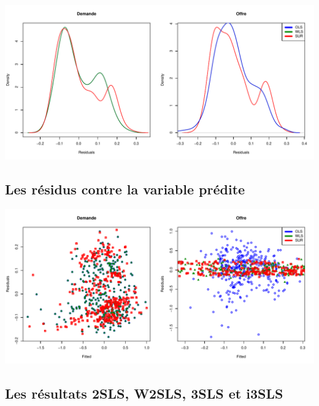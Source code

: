 \documentclass[11pt,]{article}
\begin{document}
\includegraphics{note2pres_files/figure-latex/unnamed-chunk-47-1.pdf}

\FloatBarrier

\hypertarget{les-residus-contre-la-variable-predite}{%
\subsection{Les résidus contre la variable
prédite}\label{les-residus-contre-la-variable-predite}}

\FloatBarrier

\includegraphics{note2pres_files/figure-latex/unnamed-chunk-48-1.pdf}

\FloatBarrier

\hypertarget{les-resultats-2sls-w2sls-3sls-et-i3sls}{%
\subsection{Les résultats 2SLS, W2SLS, 3SLS et
i3SLS}\label{les-resultats-2sls-w2sls-3sls-et-i3sls}}

\FloatBarrier
\end{document}

